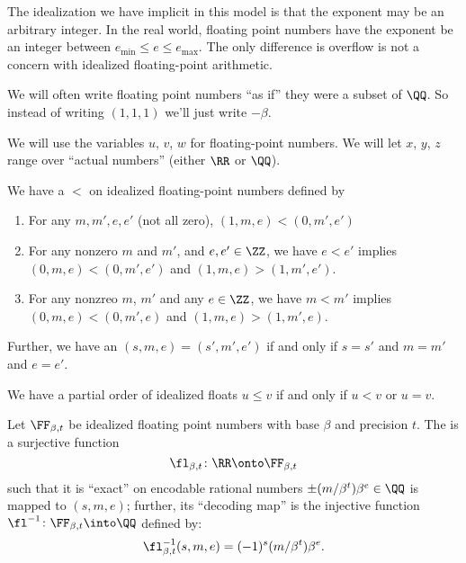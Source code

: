 \begin{rmk}[On ``Idealization'']
  The idealization we have implicit in this model is that the exponent
  may be an arbitrary integer. In the real world, floating point numbers
  have the exponent be an integer between $e_{\text{min}}\leq e\leq e_{\text{max}}$.
  The only difference is overflow is not a concern with idealized
  floating-point arithmetic.
\end{rmk}

\begin{rmk}
We will often write floating point numbers ``as if'' they were a subset
of $\QQ$. So instead of writing $(1,1,1)$ we'll just write $-\beta$.
\end{rmk}

\begin{convention}
  We will use the variables $u$, $v$, $w$ for floating-point numbers.
  We will let $x$, $y$, $z$ range over ``actual numbers'' (either $\RR$
  or $\QQ$).
\end{convention}

\begin{defn}
  We have a  $<$ on idealized floating-point numbers defined
  by
  \begin{enumerate}
    \item For any $m,m',e,e'$ (not all zero), $(1,m,e) < (0,m',e')$
    \item For any nonzero $m$ and $m'$, and $e,e'\in\ZZ$, we have $e<e'$
      implies $(0,m,e) < (0,m',e')$ and $(1,m,e) > (1,m',e')$.
    \item For any nonzreo $m$, $m'$ and any $e\in\ZZ$, we have $m<m'$
      implies $(0,m,e) < (0,m',e)$ and $(1,m,e) > (1,m',e)$.
  \end{enumerate}
  Further, we have an 
  $(s,m,e)=(s',m',e')$ if and only if $s=s'$ and $m=m'$ and $e=e'$.
\end{defn}

\begin{rmk}
  We have a partial order of idealized floats $u\leq v$ if and only if
  $u<v$ or $u=v$.
\end{rmk}

\begin{defn}
Let $\FF_{\beta,t}$ be idealized floating point numbers with base
$\beta$ and precision $t$. The  is a surjective
function
\begin{equation}
  \fl_{\beta,t}\colon\RR\onto\FF_{\beta,t}
\end{equation}
such that it is ``exact'' on encodable rational numbers $\pm(m/\beta^{t})\beta^{e}\in\QQ$
is mapped to $(s,m,e)$; further, its ``decoding map'' is the injective
function $\fl^{-1}\colon\FF_{\beta,t}\into\QQ$ defined by:
\begin{equation}
  \fl_{\beta,t}^{-1}(s,m,e) = (-1)^{s}(m/\beta^{t})\beta^{e}.
\end{equation}
\end{defn}

